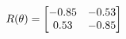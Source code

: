 \documentclass[preview]{standalone}
\begin{document}
\begin{align*}
\special{dvisvgm:raw <g id='unique000'>}R(\theta) = \begin{bmatrix}-0.85 & -0.53\\0.53 & -0.85\end{bmatrix}\special{dvisvgm:raw </g>}
\end{align*}
\end{document}
